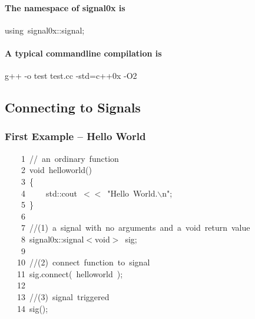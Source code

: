 \documentclass[9pt,onside,a4paper]{article}
\newcommand{\hlstd}[1]{\textcolor[rgb]{0.2,0,0.4}{#1}}
\newcommand{\hlesc}[1]{\textcolor[rgb]{0.65,0.09,0.38}{#1}}
\newcommand{\hlstr}[1]{\textcolor[rgb]{0.09,0.38,0.65}{#1}}
\newcommand{\hlslc}[1]{\textcolor[rgb]{0,0.4,0.2}{#1}}
\newcommand{\hlopt}[1]{\textcolor[rgb]{0.33,0.33,0.33}{#1}}
\newcommand{\hllin}[1]{\textcolor[rgb]{0.6,0.6,0.6}{#1}}
\newcommand{\hlkwa}[1]{\textcolor[rgb]{1,0.19,0.19}{#1}}
\newcommand{\hlkwb}[1]{\textcolor[rgb]{0.96,0.55,0.14}{#1}}
\newcommand{\hlkwd}[1]{\textcolor[rgb]{0.82,0.11,0.93}{#1}}
\begin{document}
\paragraph{The namespace of signal0x is\\}
\hlstd{}\hlkwa{using\ }\hlstd{signal0x}\hlopt{::}\hlstd{signal}\hlopt{;}\hspace*{\fill} 
\paragraph{A typical commandline compilation is\\}
\hlstd{}  g++ -o test test.cc -std=c++0x -O2



\subsection{Connecting to Signals}




\subsubsection{First Example -- Hello World}

\ttfamily
\hlstd{}\hllin{\ \ \ \ 1\ }\hlslc{//\ an\ ordinary\ function}\\
\hllin{\ \ \ \ 2\ }\hlstd{}\hlkwb{void\ }\hlstd{}\hlkwd{hello\textunderscore world}\hlstd{}\hlopt{()}\\
\hllin{\ \ \ \ 3\ }\hlstd{}\hlopt{\{}\\
\hllin{\ \ \ \ 4\ }\hlstd{}\hlstd{\ \ \ \ }\hlstd{std}\hlopt{::}\hlstd{cout\ }\hlopt{$<$$<$\ }\hlstd{}\hlstr{"Hello\ World.}\hlesc{$\backslash$n}\hlstr{"}\hlstd{}\hlopt{;}\\
\hllin{\ \ \ \ 5\ }\hlstd{}\hlopt{\}}\\
\hllin{\ \ \ \ 6\ }\hlstd{}\\
\hllin{\ \ \ \ 7\ }\hlslc{//(1)\ a\ signal\ with\ no\ arguments\ and\ a\ void\ return\ value}\\
\hllin{\ \ \ \ 8\ }\hlstd{signal0x}\hlopt{::}\hlstd{signal}\hlopt{$<$}\hlstd{}\hlkwb{void}\hlstd{}\hlopt{$>$\ }\hlstd{sig}\hlopt{;}\\
\hllin{\ \ \ \ 9\ }\hlstd{}\\
\hllin{\ \ \ 10\ }\hlslc{//(2)\ connect\ function\ to\ signal}\\
\hllin{\ \ \ 11\ }\hlstd{sig}\hlopt{.}\hlstd{}\hlkwd{connect}\hlstd{}\hlopt{(\ }\hlstd{hello\textunderscore world\ }\hlopt{);}\\
\hllin{\ \ \ 12\ }\hlstd{}\\
\hllin{\ \ \ 13\ }\hlslc{//(3)\ signal\ triggered}\\
\hllin{\ \ \ 14\ }\hlstd{}\hlkwd{sig}\hlstd{}\hlopt{();}\hlstd{}\\
\mbox{}
\normalfont
\normalsize
\end{document}
